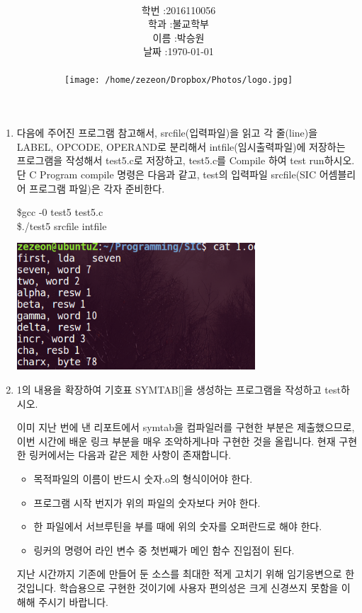 \documentclass[12pt,a4paper]{article}
\title{
	\centering
	\pgfornament[width=12cm,color=teal]{84}\\
	\vspace{1cm}
	\fontsize{50}{50} \selectfont {시스템 S/W 실습5}\\
	\pgfornament[width=12cm,color=teal]{88}\\
	\vfill}
\author{
	\LARGE
	\begin{tabular}{rl}
		\hline
		학번 : & 2016110056\\ 
		학과 : & 불교학부 \\
		이름 : & 박승원\\
		날짜 : & \today\\
		\hline
	\end{tabular}\vspace{2cm}
	\\
	\texttt{[image: /home/zezeon/Dropbox/Photos/logo.jpg]}
}
\date{}
\begin{document}
\maketitle
\noindent
\lstset{columns=flexible, tabsize=4, frame=single, showstringspaces=false, breaklines=true, upquote=true}
\begin{enumerate}

\lstset{language=C}
\item 다음에 주어진 프로그램 참고해서, srcfile(입력파일)을 읽고 각 줄(line)을 LABEL, OPCODE, OPERAND로 분리해서 intfile(임시출력파일)에 저장하는 프로그램을 작성해서 test5.c로 저장하고, test5.c를 Compile 하여 test run하시오. \\
단 C Program compile 명령은 다음과 같고, test의 입력파일 srcfile(SIC 어셈블리어 프로그램 파일)은 각자 준비한다.

\$gcc -0 test5 test5.c\\
\$./test5 srcfile intfile




\includegraphics[width=0.7\textwidth]{test5.png}

\item 1의 내용을 확장하여 기호표 SYMTAB[]을 생성하는 프로그램을 작성하고  test하시오.

이미 지난 번에 낸 리포트에서 symtab을 컴파일러를 구현한 부분은 제출했으므로, 이번 시간에 배운 링크 부분을 매우 조악하게나마 구현한 것을 올립니다.
현재 구현한 링커에서는 다음과 같은 제한 사항이 존재합니다.
\begin{itemize}
	\item 목적파일의 이름이 반드시 숫자.o의 형식이어야 한다.
	\item 프로그램 시작 번지가 위의 파일의 숫자보다 커야 한다.
	\item 한 파일에서 서브루틴을 부를 때에 위의 숫자를 오퍼란드로 해야 한다.
	\item 링커의 명령어 라인 변수 중 첫번째가 메인 함수 진입점이 된다.
\end{itemize}
지난 시간까지 기존에 만들어 둔 소스를 최대한 적게 고치기 위해 임기응변으로 한 것입니다.
학습용으로 구현한 것이기에 사용자 편의성은 크게 신경쓰지 못함을 이해해 주시기 바랍니다.


\end{enumerate}
\end{document}
